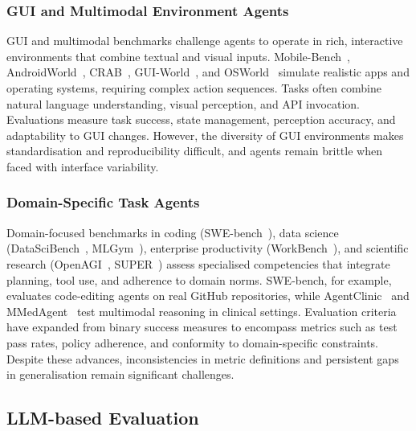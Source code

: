 \subsubsection{GUI and Multimodal Environment Agents}
GUI and multimodal benchmarks challenge agents to operate in rich, interactive environments that combine textual and visual inputs. Mobile-Bench~\citep{deng2024mobile}, AndroidWorld~\citep{rawles2024androidworld}, CRAB~\citep{xu2024crab}, GUI-World~\citep{chen2024gui}, and OSWorld~\citep{xie2024osworld} simulate realistic apps and operating systems, requiring complex action sequences. Tasks often combine natural language understanding, visual perception, and API invocation. Evaluations measure task success, state management, perception accuracy, and adaptability to GUI changes. However, the diversity of GUI environments makes standardisation and reproducibility difficult, and agents remain brittle when faced with interface variability.


\subsubsection{Domain-Specific Task Agents}
Domain-focused benchmarks in coding (SWE-bench~\citep{jimenez2023swe}), data science (DataSciBench~\citep{zhang2025datascibench}, MLGym~\citep{nathani2025mlgym}), enterprise productivity (WorkBench~\citep{styles2024workbench}), and scientific research (OpenAGI~\citep{ge2023openagi}, SUPER~\citep{bogin2024super}) assess specialised competencies that integrate planning, tool use, and adherence to domain norms. SWE-bench, for example, evaluates code-editing agents on real GitHub repositories, while AgentClinic~\citep{schmidgall2024agentclinic} and MMedAgent~\citep{li2024mmedagent} test multimodal reasoning in clinical settings. 
Evaluation criteria have expanded from binary success measures to encompass metrics such as test pass rates, policy adherence, and conformity to domain-specific constraints. Despite these advances, inconsistencies in metric definitions and persistent gaps in generalisation remain significant challenges.



\subsection{LLM-based Evaluation}

